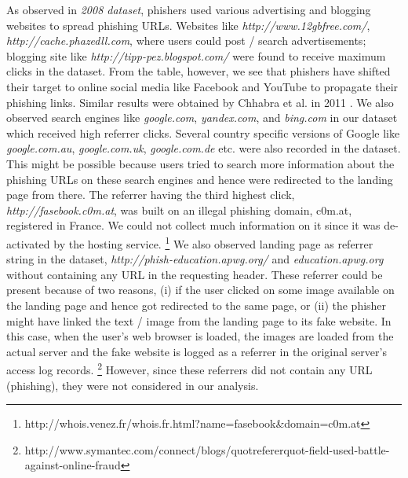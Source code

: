 \documentclass[conference]{IEEEtran}
\begin{document}
As observed in \textit{2008 dataset}, phishers used various advertising and blogging websites to spread phishing URLs. Websites like \textit{http://www.12gbfree.com/}, \textit{http://cache.phazedll.com}, where users could post / search advertisements; blogging site like \textit{http://tipp-pez.blogspot.com/} were found to receive maximum clicks in the dataset. From the table, however, we see that phishers have shifted their target to online social media like Facebook and YouTube to propagate their phishing links. Similar results were obtained by Chhabra et al. in 2011 \cite{chhabra}. We also observed search engines like \textit{google.com}, \textit{yandex.com}, and \textit{bing.com} in our dataset which received high referrer clicks. Several country specific versions of Google like \textit{google.com.au}, \textit{google.com.uk}, \textit{google.com.de} etc. were also recorded in the dataset. This might be possible because users tried to search more information about the phishing URLs on these search engines and hence were redirected to the landing page from there. The referrer having the third highest click, \textit{http://fasebook.c0m.at}, was built on an illegal phishing domain, c0m.at, registered in France. We could not collect much information on it since it was de-activated by the hosting service. \footnote{http://whois.venez.fr/whois.fr.html?name=fasebook\&domain=c0m.at}
We also observed landing page as referrer string in the dataset, \textit{http://phish-education.apwg.org/} and \textit{education.apwg.org} without containing any URL in the requesting header. These referrer could be present because of two reasons, (i) if the user clicked on some image available on the landing page and hence got redirected to the same page, or (ii) the phisher might have linked the text / image from the landing page to its fake website. In this case, when the user's web browser is loaded, the images are loaded from the actual server and the fake website is logged as a referrer in the original server's access log records. \footnote{http://www.symantec.com/connect/blogs/quotrefererquot-field-used-battle-against-online-fraud} However, since these referrers did not contain any URL (phishing), they were not considered in our analysis.
\end{document}
